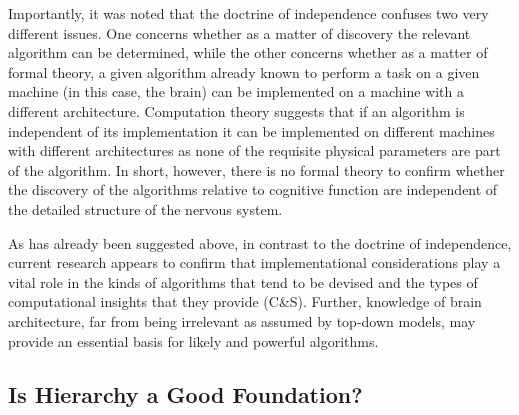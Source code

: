 \documentclass[10pt,letterpaper]{article}
\begin{document}
Importantly, it was noted that the doctrine of independence confuses two very different issues. One concerns whether as a matter of discovery the relevant algorithm can be determined, while the other concerns whether as a matter of formal theory, a given algorithm already known to perform a task on a given machine (in this case, the brain) can be implemented on a machine with a different architecture. Computation theory suggests that if an algorithm is independent of its implementation it can be implemented on different machines with different architectures as none of the requisite physical parameters are part of the algorithm. In short, however, there is no formal theory to confirm whether the discovery of the algorithms relative to cognitive function are independent of the detailed structure of the nervous system.

As has already been suggested above, in contrast to the doctrine of independence, current research appears to confirm that implementational considerations play a vital role in the kinds of algorithms that tend to be devised and the types of computational insights that they provide (C\&S). Further, knowledge of brain architecture, far from being irrelevant as assumed by top-down models, may provide an essential basis for likely and powerful algorithms.

\subsection*{Is Hierarchy a Good Foundation?}


\end{document}

